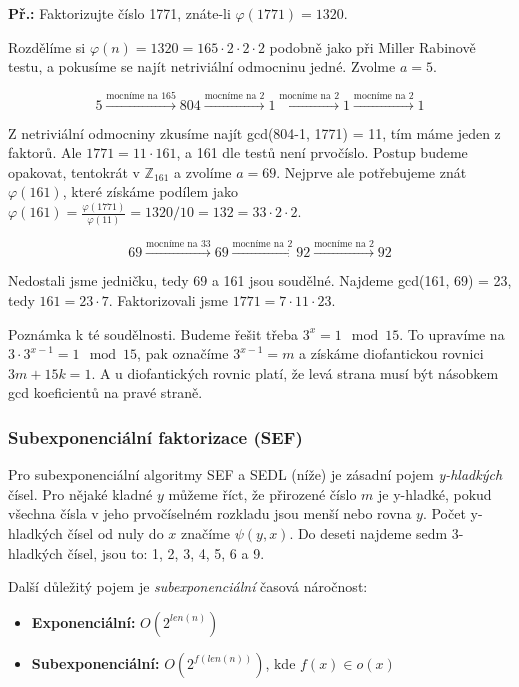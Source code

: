 \documentclass[10pt,a4paper]{article}
\begin{document}
\begin{exercise}
\textbf{Př.:} Faktorizujte číslo 1771, znáte-li $\varphi(1771) = 1320$.

Rozdělíme si $\varphi(n) = 1320 = 165 \cdot 2 \cdot 2 \cdot 2$ podobně jako při
Miller Rabinově testu, a pokusíme se najít netriviální odmocninu jedné. Zvolme
$a = 5$.

$$ 5 \xrightarrow{\text{mocníme na 165}} 804 \xrightarrow{\text{mocníme na 2}} 1
\xrightarrow{\text{mocníme na 2}} 1 \xrightarrow{\text{mocníme na 2}} 1$$

Z netriviální odmocniny zkusíme najít gcd(804-1, 1771) = 11, tím máme jeden z
faktorů. Ale $1771 = 11 \cdot 161$, a 161 dle testů není prvočíslo. Postup
budeme opakovat, tentokrát v $\mathbb{Z}_{161}$ a zvolíme $a = 69$. Nejprve ale
potřebujeme znát $\varphi(161)$, které získáme podílem jako $\varphi(161) =
\frac{\varphi(1771)}{\varphi(11)} = 1320/10 = 132 = 33 \cdot 2 \cdot 2$.

$$69 \xrightarrow{\text{mocníme na 33}} 69 \xrightarrow{\text{mocníme na 2}} 92
\xrightarrow{\text{mocníme na 2}} 92$$

Nedostali jsme jedničku, tedy 69 a 161 jsou soudělné. Najdeme gcd(161, 69) = 23,
tedy $161 = 23 \cdot 7$. Faktorizovali jsme $1771 = 7 \cdot 11 \cdot 23$.

Poznámka k té soudělnosti. Budeme řešit třeba $3^x = 1 \mod 15$. To upravíme na
$3\cdot 3^{x-1} = 1 \mod 15$, pak označíme $3^{x-1} = m$ a získáme diofantickou
rovnici $3m + 15k = 1$. A u diofantických rovnic platí, že levá strana musí být
násobkem gcd koeficientů na pravé straně.
\end{exercise}

\subsubsection{Subexponenciální faktorizace (SEF)}
Pro subexponenciální algoritmy SEF a SEDL (níže) je zásadní pojem
\textit{y-hladkých} čísel. Pro nějaké kladné $y$ můžeme říct, že přirozené číslo
$m$ je y-hladké, pokud všechna čísla v jeho prvočíselném rozkladu jsou menší
nebo rovna $y$. Počet y-hladkých čísel od nuly do $x$ značíme $\psi(y, x)$. Do
deseti najdeme sedm 3-hladkých čísel, jsou to: 1, 2, 3, 4, 5, 6 a 9.

Další důležitý pojem je \textit{subexponenciální} časová náročnost:
\begin{itemize}
\item \textbf{Exponenciální:} $O(2^{len(n)})$
\item \textbf{Subexponenciální:} $O(2^{f(len(n))})$, kde $f(x)\in o(x)$
\end{itemize}
\end{document}
